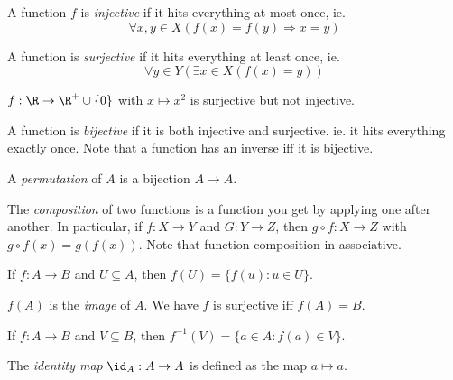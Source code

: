 \documentclass[a4paper]{article}
\begin{document}
  \begin{defi}
    A function $f$ is \emph{injective} if it hits everything at most once, ie.
    \[
      \forall x, y\in X(f(x) = f(y)\Rightarrow x = y)
    \]
  \end{defi}

  \begin{defi}
    A function is \emph{surjective} if it hits everything at least once, ie. 
    \[
      \forall y\in Y(\exists x\in X(f(x) = y))
    \]
  \end{defi}

  \begin{eg}
    $f: \R \to\R^+\cup\{0\}$ with $x \mapsto x^2$ is surjective but not injective.
  \end{eg}

  \begin{defi}
    A function is \emph{bijective} if it is both injective and surjective. ie. it hits everything exactly once. Note that a function has an inverse iff it is bijective.
  \end{defi}

  \begin{defi}
    A \emph{permutation} of $A$ is a bijection $A\to A$.
  \end{defi}

  \begin{defi}
    The \emph{composition} of two functions is a function you get by applying one after another. In particular, if $f: X \rightarrow Y$ and $G: Y\rightarrow Z$, then $g\circ f: X \rightarrow Z$ with $g\circ f(x) = g(f(x))$. Note that function composition in associative.
  \end{defi}

  \begin{defi}
    If $f: A\to B$ and $U\subseteq A$, then $f(U) = \{f(u):u\in U\}$.

    $f(A)$ is the \emph{image} of $A$. We have $f$ is surjective iff $f(A) = B$.
  \end{defi}

  \begin{defi}
    If $f: A\to B$ and $V\subseteq B$, then $f^{-1}(V) = \{a\in A: f(a)\in V\}$.
  \end{defi}

  \begin{defi}
    The \emph{identity map} $\id _A: A\to A$ is defined as the map $a\mapsto a$.
  \end{defi}
\end{document}
